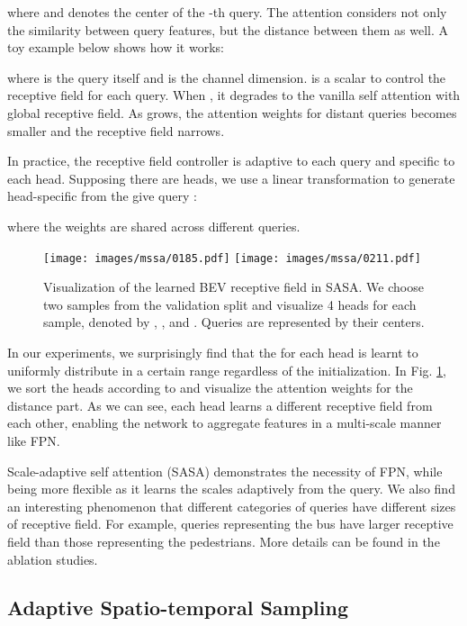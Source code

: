 \documentclass[10pt,twocolumn,letterpaper]{article}
\begin{document}
where  and  denotes the center of the -th query. The attention considers not only the similarity between query features, but the distance between them as well. A toy example below shows how it works:

where  is the query itself and  is the channel dimension.  is a scalar to control the receptive field for each query. When , it degrades to the vanilla self attention with global receptive field. As  grows, the attention weights for distant queries becomes smaller and the receptive field narrows.

In practice, the receptive field controller  is adaptive to each query and specific to each head. Supposing there are  heads, we use a linear transformation to generate head-specific  from the give query :

where the weights are shared across different queries.

\begin{figure}[t]
  \centering
  \texttt{[image: images/mssa/0185.pdf]}
  \texttt{[image: images/mssa/0211.pdf]}
  \vspace{-20pt}
  \caption{Visualization of the learned BEV receptive field in SASA. We choose two samples from the validation split and visualize 4 heads for each sample, denoted by , ,  and . Queries are represented by their centers.}
  \label{fig:mssa_receptive_field}
  \vspace{-5pt}
\end{figure}

In our experiments, we surprisingly find that the  for each head is learnt to uniformly distribute in a certain range regardless of the initialization. In Fig. \ref{fig:mssa_receptive_field}, we sort the heads according to  and visualize the attention weights for the distance part. As we can see, each head learns a different receptive field from each other, enabling the network to aggregate features in a multi-scale manner like FPN.

Scale-adaptive self attention (SASA) demonstrates the necessity of FPN, while being more flexible as it learns the scales adaptively from the query. We also find an interesting phenomenon that different categories of queries have different sizes of receptive field. For example, queries representing the bus have larger receptive field than those representing the pedestrians. More details can be found in the ablation studies.

\subsection{Adaptive Spatio-temporal Sampling}
\end{document}
